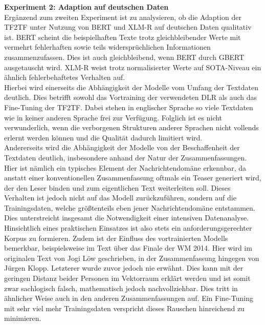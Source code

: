 \noindent
\textbf{Experiment 2: Adaption auf deutschen Daten}\\
\noindent
Ergänzend zum zweiten Experiment ist zu analysieren, ob die Adaption der \ac{TF2TF} unter Nutzung von \ac{BERT} und \ac{XLM-R} auf deutschen Daten qualitativ ist. \ac{BERT} scheint die beispielhaften Texte trotz gleichbleibender Werte mit vermehrt fehlerhaften sowie teils widersprüchlichen Informationen zusammenzufassen. Dies ist auch gleichbleibend, wenn \ac{BERT} durch \ac{GBERT} ausgetauscht wird. \ac{XLM-R} weist trotz normalisierter Werte auf \ac{SOTA}-Niveau ein ähnlich fehlerbehaftetes Verhalten auf.\\

\noindent
Hierbei wird einerseits die Abhängigkeit der Modelle vom Umfang der Textdaten deutlich. Dies betrifft sowohl das Vortraining der verwendeten \ac{DLR} als auch das Fine-Tuning der \ac{TF2TF}. Dabei stehen in englischer Sprache so viele Textdaten wie in keiner anderen Sprache frei zur Verfügung. Folglich ist es nicht verwunderlich, wenn die verborgenen Strukturen anderer Sprachen nicht vollends erlernt werden können und die Qualität dadurch limitiert wird.\\

\noindent
Andererseits wird die Abhängigkeit der Modelle von der Beschaffenheit der Textdaten deutlich, insbesondere anhand der Natur der Zusammenfassungen. Hier ist nämlich ein typisches Element der Nachrichtendomäne erkennbar, da anstatt einer konventionellen Zusammenfassung oftmals ein Teaser generiert wird, der den Leser binden und zum eigentlichen Text weiterleiten soll. Dieses Verhalten ist jedoch nicht auf das Modell zurückzuführen, sondern auf die Trainingsdaten, welche größtenteils eben jener Nachrichtendomäne entstammen. Dies unterstreicht insgesamt die Notwendigkeit einer intensiven Datenanalyse. Hinsichtlich eines praktischen Einsatzes ist also stets ein anforderungsgerechter Korpus zu formieren. Zudem ist der Einfluss des vortrainierten Modells bemerkbar, beispielsweise im Text über das Finale der WM 2014. Hier wird im originalen Text von Jogi Löw geschrieben, in der Zusammenfassung hingegen von Jürgen Klopp. Letzterer wurde zuvor jedoch nie erwähnt. Dies kann mit der geringen Distanz beider Personen im Vektorraum erklärt werden und ist somit zwar sachlogisch falsch, mathematisch jedoch nachvollziehbar. Dies tritt in ähnlicher Weise auch in den anderen Zusammenfassungen auf. Ein Fine-Tuning mit sehr viel mehr Trainingsdaten verspricht dieses Rauschen hinreichend zu minimieren.
\newpage

